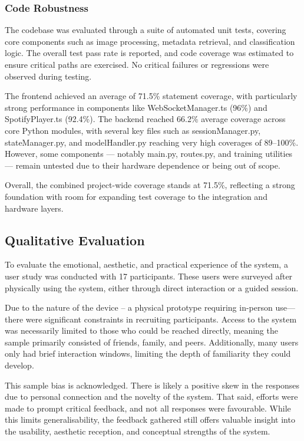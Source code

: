             \subsubsection{Code Robustness}
    
                The codebase was evaluated through a suite of automated unit tests, covering core components such as image processing, metadata retrieval, and classification logic. The overall test pass rate is reported, and code coverage was estimated to ensure critical paths are exercised. No critical failures or regressions were observed during testing.
    
                The frontend achieved an average of 71.5\% statement coverage, with particularly strong performance in components like WebSocketManager.ts (96\%) and SpotifyPlayer.ts (92.4\%). The backend reached 66.2\% average coverage across core Python modules, with several key files such as sessionManager.py, stateManager.py, and modelHandler.py reaching very high coverages of 89–100\%. However, some components — notably main.py, routes.py, and training utilities — remain untested due to their hardware dependence or being out of scope.
                
                Overall, the combined project-wide coverage stands at 71.5\%, reflecting a strong foundation with room for expanding test coverage to the integration and hardware layers.
    
        \subsection{Qualitative Evaluation}
    
            To evaluate the emotional, aesthetic, and practical experience of the system, a user study was conducted with 17 participants. These users were surveyed after physically using the system, either through direct interaction or a guided session.
    
            Due to the nature of the device -- a physical prototype requiring in-person use—there were significant constraints in recruiting participants. Access to the system was necessarily limited to those who could be reached directly, meaning the sample primarily consisted of friends, family, and peers. Additionally, many users only had brief interaction windows, limiting the depth of familiarity they could develop.
            
            This sample bias is acknowledged. There is likely a positive skew in the responses due to personal connection and the novelty of the system. That said, efforts were made to prompt critical feedback, and not all responses were favourable. While this limits generalisability, the feedback gathered still offers valuable insight into the usability, aesthetic reception, and conceptual strengths of the system.
    
